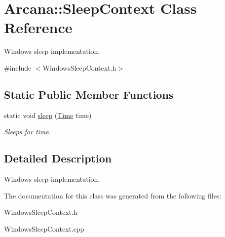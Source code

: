 \hypertarget{class_arcana_1_1_sleep_context}{}\section{Arcana\+:\+:Sleep\+Context Class Reference}
\label{class_arcana_1_1_sleep_context}


Windows sleep implementation.  




{\ttfamily \#include $<$Windows\+Sleep\+Context.\+h$>$}

\subsection*{Static Public Member Functions}
\begin{DoxyCompactItemize}
\item 
\mbox{\label{class_arcana_1_1_sleep_context_ab1d1ffcdeed934cdf248ba60e80dbe23}} 
static void \mbox{\hyperlink{class_arcana_1_1_sleep_context_ab1d1ffcdeed934cdf248ba60e80dbe23}{sleep}} (\mbox{\hyperlink{class_arcana_1_1_time}{Time}} time)
\begin{DoxyCompactList}\small\item\em Sleeps for \textquotesingle{}time\textquotesingle{}. \end{DoxyCompactList}\end{DoxyCompactItemize}


\subsection{Detailed Description}
Windows sleep implementation. 

The documentation for this class was generated from the following files\+:\begin{DoxyCompactItemize}
\item 
Windows\+Sleep\+Context.\+h\item 
Windows\+Sleep\+Context.\+cpp\end{DoxyCompactItemize}
